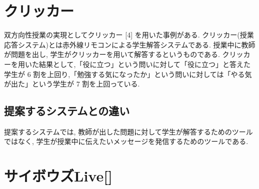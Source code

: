 \documentclass{funthesis}
\begin{document}
\section{クリッカー}
双方向性授業の実現としてクリッカー [4] を用いた事例がある. クリッカー(授業応答システム)とは赤外線リモコンによる学生解答システムである. 授業中に教師が問題を出し, 学生がクリッカーを用いて解答するというものである. クリッカーを用いた結果として,「役に立つ」という問いに対して「役に立つ」と答えた学生が 6 割を上回り,「勉強する気になったか」という問いに対しては「やる気が出た」という学生が 7 割を上回っている.
\subsection{提案するシステムとの違い}
提案するシステムでは, 教師が出した問題に対して学生が解答するためのツールではなく, 学生が授業中に伝えたいメッセージを発信するためのツールである. 


\section{サイボウズLive[] }


\end{document}
